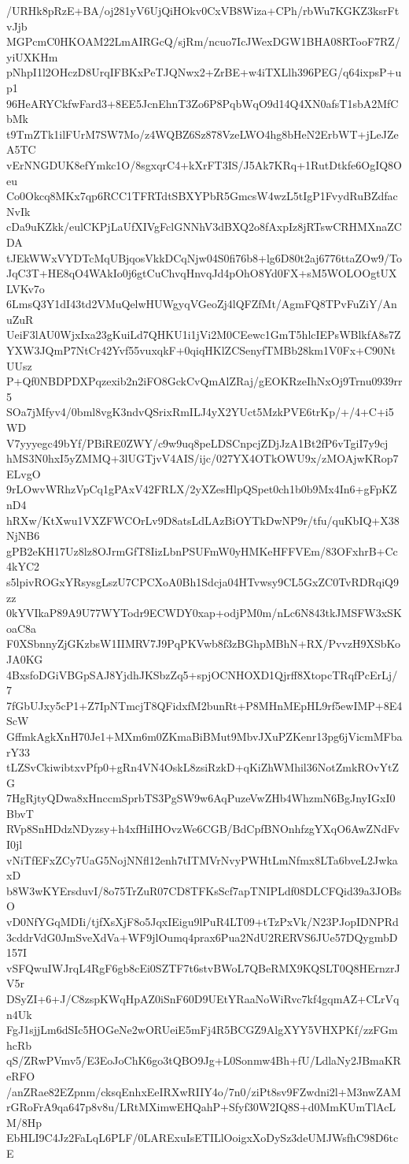 /URHk8pRzE+BA/oj281yV6UjQiHOkv0CxVB8Wiza+CPh/rbWu7KGKZ3ksrFtvJjb
MGPcmC0HKOAM22LmAIRGcQ/sjRm/ncuo7IcJWexDGW1BHA08RTooF7RZ/yiUXKHm
pNhpI1l2OHczD8UrqIFBKxPeTJQNwx2+ZrBE+w4iTXLlh396PEG/q64ixpsP+up1
96HeARYCkfwFard3+8EE5JcnEhnT3Zo6P8PqbWqO9d14Q4XN0afsT1sbA2MfCbMk
t9TmZTk1ilFUrM7SW7Mo/z4WQBZ6Sz878VzeLWO4hg8bHeN2ErbWT+jLeJZeA5TC
vErNNGDUK8efYmkc1O/8sgxqrC4+kXrFT3IS/J5Ak7KRq+1RutDtkfe6OgIQ8Oeu
Co0Okcq8MKx7qp6RCC1TFRTdtSBXYPbR5GmcsW4wzL5tIgP1FvydRuBZdfacNvIk
cDa9uKZkk/eulCKPjLaUfXIVgFclGNNhV3dBXQ2o8fAxpIz8jRTswCRHMXnaZCDA
tJEkWWxVYDTcMqUBjqosVkkDCqNjw04S0fi76b8+lg6D80t2aj6776ttaZOw9/To
JqC3T+HE8qO4WAkIo0j6gtCuChvqHnvqJd4pOhO8Yd0FX+sM5WOLOOgtUXLVKv7o
6LmsQ3Y1dI43td2VMuQelwHUWgyqVGeoZj4lQFZfMt/AgmFQ8TPvFuZiY/AnuZuR
UeiF3lAU0WjxIxa23gKuiLd7QHKU1i1jVi2M0CEewc1GmT5hlcIEPsWBlkfA8s7Z
YXW3JQmP7NtCr42Yvf55vuxqkF+0qiqHKlZCSenyfTMBb28km1V0Fx+C90NtUUsz
P+Qf0NBDPDXPqzexib2n2iFO8GckCvQmAlZRaj/gEOKRzeIhNxOj9Trnu0939rr5
SOa7jMfyv4/0bml8vgK3ndvQSrixRmILJ4yX2YUct5MzkPVE6trKp/+/4+C+i5WD
V7yyyegc49bYf/PBiRE0ZWY/c9w9uq8peLDSCnpcjZDjJzA1Bt2fP6vTgiI7y9cj
hMS3N0hxI5yZMMQ+3lUGTjvV4AIS/ijc/027YX4OTkOWU9x/zMOAjwKRop7ELvgO
9rLOwvWRhzVpCq1gPAxV42FRLX/2yXZesHlpQSpet0ch1b0b9Mx4In6+gFpKZnD4
hRXw/KtXwu1VXZFWCOrLv9D8atsLdLAzBiOYTkDwNP9r/tfu/quKbIQ+X38NjNB6
gPB2eKH17Uz8lz8OJrmGfT8IizLbnPSUFmW0yHMKeHFFVEm/83OFxhrB+Cc4kYC2
s5lpivROGxYRsysgLszU7CPCXoA0Bh1Sdcja04HTvwsy9CL5GxZC0TvRDRqiQ9zz
0kYVIkaP89A9U77WYTodr9ECWDY0xap+odjPM0m/nLc6N843tkJMSFW3xSKoaC8a
F0XSbnnyZjGKzbsW1IIMRV7J9PqPKVwb8f3zBGhpMBhN+RX/PvvzH9XSbKoJA0KG
4BxsfoDGiVBGpSAJ8YjdhJKSbzZq5+spjOCNHOXD1Qjrff8XtopcTRqfPcErLj/7
7fGbUJxy5cP1+Z7IpNTmcjT8QFidxfM2bunRt+P8MHnMEpHL9rf5ewIMP+8E4ScW
GffmkAgkXnH70Je1+MXm6m0ZKmaBiBMut9MbvJXuPZKenr13pg6jVicmMFbarY33
tLZSvCkiwibtxvPfp0+gRn4VN4OskL8zsiRzkD+qKiZhWMhil36NotZmkROvYtZG
7HgRjtyQDwa8xHnccmSprbTS3PgSW9w6AqPuzeVwZHb4WhzmN6BgJnyIGxI0BbvT
RVp8SnHDdzNDyzsy+h4xfHiIHOvzWe6CGB/BdCpfBNOnhfzgYXqO6AwZNdFvI0jl
vNiTfEFxZCy7UaG5NojNNfl12enh7tITMVrNvyPWHtLmNfmx8LTa6bveL2JwkaxD
b8W3wKYErsduvI/8o75TrZuR07CD8TFKsScf7apTNIPLdf08DLCFQid39a3JOBsO
vD0NfYGqMDIi/tjfXsXjF8o5JqxIEigu9lPuR4LT09+tTzPxVk/N23PJopIDNPRd
3cddrVdG0JmSveXdVa+WF9jlOumq4prax6Pua2NdU2RERVS6JUe57DQygmbD157I
vSFQwuIWJrqL4RgF6gb8cEi0SZTF7t6stvBWoL7QBeRMX9KQSLT0Q8HErnzrJV5r
DSyZI+6+J/C8zspKWqHpAZ0iSnF60D9UEtYRaaNoWiRvc7kf4gqmAZ+CLrVqn4Uk
FgJ1sjjLm6dSIc5HOGeNe2wORUeiE5mFj4R5BCGZ9AlgXYY5VHXPKf/zzFGmhcRb
qS/ZRwPVmv5/E3EoJoChK6go3tQBO9Jg+L0Sonmw4Bh+fU/LdlaNy2JBmaKReRFO
/anZRae82EZpnm/cksqEnhxEeIRXwRIIY4o/7n0/ziPt8sv9FZwdni2l+M3nwZAM
rGRoFrA9qa647p8v8u/LRtMXimwEHQahP+Sfyf30W2IQ8S+d0MmKUmTlAcLM/8Hp
EbHLI9C4Jz2FaLqL6PLF/0LARExuIsETILlOoigxXoDySz3deUMJWsfhC98D6tcE
